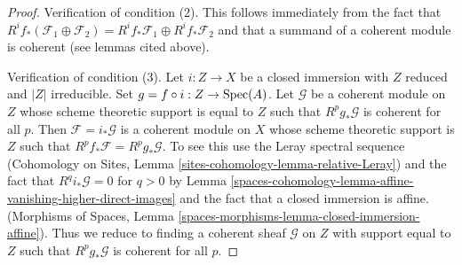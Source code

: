 \begin{proof}
\medskip\noindent
Verification of condition (2). This follows immediately from the fact
that $R^if_*(\mathcal{F}_1 \oplus \mathcal{F}_2) =
R^if_*\mathcal{F}_1 \oplus R^if_*\mathcal{F}_2$ and that a summand
of a coherent module is coherent (see lemmas cited above).

\medskip\noindent
Verification of condition (3). Let $i : Z \to X$ be a closed immersion
with $Z$ reduced and $|Z|$ irreducible. Set $g = f \circ i : Z \to \operatorname{Spec}(A)$.
Let $\mathcal{G}$ be a coherent module on $Z$ whose scheme theoretic support
is equal to $Z$ such that $R^pg_*\mathcal{G}$ is coherent for all $p$.
Then $\mathcal{F} = i_*\mathcal{G}$ is a coherent module on
$X$ whose scheme theoretic support is $Z$ such that
$R^pf_*\mathcal{F} = R^pg_*\mathcal{G}$. To see this use
the Leray spectral sequence
(Cohomology on Sites, Lemma \ref{sites-cohomology-lemma-relative-Leray})
and the fact that $R^qi_*\mathcal{G} = 0$ for $q > 0$ by
Lemma \ref{spaces-cohomology-lemma-affine-vanishing-higher-direct-images}
and the fact that a closed immersion is affine.
(Morphisms of Spaces, Lemma
\ref{spaces-morphisms-lemma-closed-immersion-affine}).
Thus we reduce to finding a coherent sheaf $\mathcal{G}$ on $Z$
with support equal to $Z$ such that $R^pg_*\mathcal{G}$ is coherent
for all $p$.


\end{proof}
